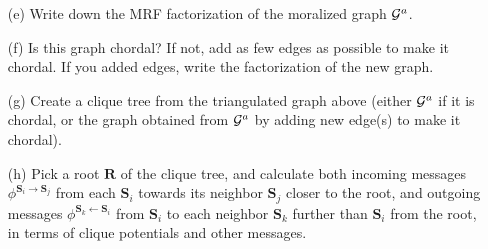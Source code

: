 \documentclass[11pt]{article}
\renewcommand{\vec}[1]{\mathbf{#1}}
\begin{document}
\begin{itemize}
\begin{answertext}{5cm}{}

\end{answertext}

\item[(e)] Write down the MRF factorization of the moralized graph ${\cal G}^a$.

\begin{answertext}{3cm}{}    



\end{answertext}

\item[(f)] Is this graph chordal?  If not, add as few edges as possible to make it chordal.  If you added edges, write the factorization of the new graph.

\begin{answertext}{5cm}{}

\end{answertext}
\item[(g)] Create a clique tree from the triangulated graph above (either ${\cal G}^a$ if it is chordal, or the graph obtained from ${\cal G}^a$ by adding new edge(s) to make it chordal).

\begin{answertext}{5.5cm}{}

\end{answertext}

\item[(h)] Pick a root $\vec{R}$ of the clique tree, and calculate both incoming messages $\phi^{\vec{S}_i\to\vec{S}_j}$ from each
$\vec{S}_i$ towards its neighbor $\vec{S}_j$ closer to the root, and outgoing messages $\phi^{\vec{S}_k\gets\vec{S}_i}$ from $\vec{S}_i$ to each neighbor $\vec{S}_k$ further than $\vec{S}_i$ from the root, in terms of clique potentials and other messages.

\begin{answertext}{6cm}{}

\end{answertext}


\end{itemize}
\end{document}
